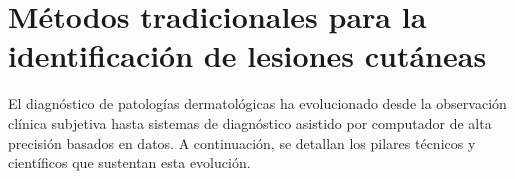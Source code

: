 
\section{Métodos tradicionales para la identificación de lesiones cutáneas}

 El diagnóstico de patologías dermatológicas ha evolucionado desde la observación clínica subjetiva hasta sistemas de diagnóstico asistido por computador de alta precisión basados en datos. A continuación, se detallan los pilares técnicos y científicos que sustentan esta evolución.

